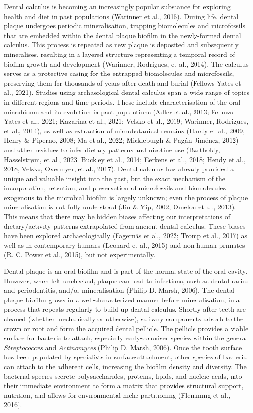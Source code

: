 \documentclass[
  letterpaper,
]{book}
\begin{document}
Dental calculus is becoming an increasingly popular substance for
exploring health and diet in past populations (Warinner et al., 2015).
During life, dental plaque undergoes periodic mineralisation, trapping
biomolecules and microfossils that are embedded within the dental plaque
biofilm in the newly-formed dental calculus. This process is repeated as
new plaque is deposited and subsequently mineralises, resulting in a
layered structure representing a temporal record of biofilm growth and
development (Warinner, Rodrigues, et al., 2014). The calculus serves as
a protective casing for the entrapped biomolecules and microfossils,
preserving them for thousands of years after death and burial (Fellows
Yates et al., 2021). Studies using archaeological dental calculus span a
wide range of topics in different regions and time periods. These
include characterisation of the oral microbiome and its evolution in
past populations (Adler et al., 2013; Fellows Yates et al., 2021;
Kazarina et al., 2021; Velsko et al., 2019; Warinner, Rodrigues, et al.,
2014), as well as extraction of microbotanical remains (Hardy et al.,
2009; Henry \& Piperno, 2008; Ma et al., 2022; Mickleburgh \&
Pagán-Jiménez, 2012) and other residues to infer dietary patterns and
nicotine use (Bartholdy, Hasselstrøm, et al., 2023; Buckley et al.,
2014; Eerkens et al., 2018; Hendy et al., 2018; Velsko, Overmyer, et
al., 2017). Dental calculus has already provided a unique and valuable
insight into the past, but the exact mechanism of the incorporation,
retention, and preservation of microfossils and biomolecules exogenous
to the microbial biofilm is largely unknown; even the process of plaque
mineralisation is not fully understood (Jin \& Yip, 2002; Omelon et al.,
2013). This means that there may be hidden biases affecting our
interpretations of dietary/activity patterns extrapolated from ancient
dental calculus. These biases have been explored archaeologically
(Fagernäs et al., 2022; Tromp et al., 2017) as well as in contemporary
humans (Leonard et al., 2015) and non-human primates (R. C. Power et
al., 2015), but not experimentally.

Dental plaque is an oral biofilm and is part of the normal state of the
oral cavity. However, when left unchecked, plaque can lead to
infections, such as dental caries and periodontitis, and/or
mineralisation (Philip D. Marsh, 2006). The dental plaque biofilm grows
in a well-characterized manner before mineralisation, in a process that
repeats regularly to build up dental calculus. Shortly after teeth are
cleaned (whether mechanically or otherwise), salivary components adsorb
to the crown or root and form the acquired dental pellicle. The pellicle
provides a viable surface for bacteria to attach, especially
early-coloniser species within the genera \emph{Streptococcus} and
\emph{Actinomyces} (Philip D. Marsh, 2006). Once the tooth surface has
been populated by specialists in surface-attachment, other species of
bacteria can attach to the adherent cells, increasing the biofilm
density and diversity. The bacterial species secrete polysaccharides,
proteins, lipids, and nucleic acids, into their immediate environment to
form a matrix that provides structural support, nutrition, and allows
for environmental niche partitioning (Flemming et al., 2016).
\end{document}
